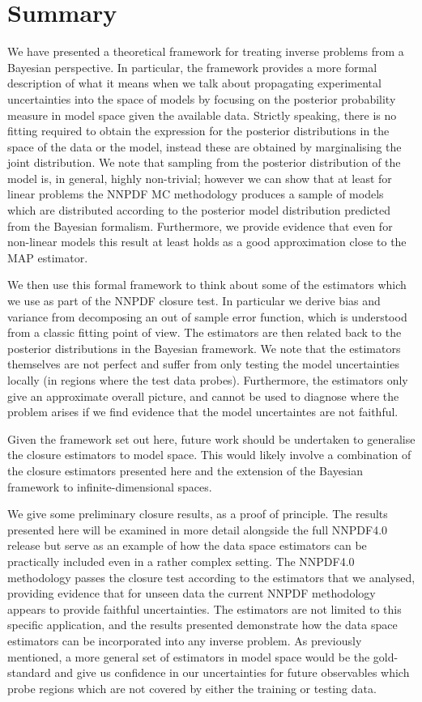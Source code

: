 \section{Summary}

We have presented a theoretical framework for treating inverse problems from a
Bayesian perspective. In particular, the framework provides a more formal
description of what it means when we talk about propagating experimental
uncertainties into the space of models by focusing on the posterior probability
measure in model space given the available data. Strictly speaking, there is no
fitting required to obtain the expression for the posterior distributions in the
space of the data or the model, instead these are obtained by marginalising the
joint distribution. We note that sampling from the posterior distribution of the
model is, in general, highly non-trivial; however we can show that at least for
linear problems the NNPDF MC methodology produces a sample of models which are
distributed according to the posterior model distribution predicted from the
Bayesian formalism. Furthermore, we provide evidence that even for non-linear
models this result at least holds as a good approximation close to the MAP
estimator.

We then use this formal framework to think about some of the estimators which we
use as part of the NNPDF closure test. In particular we derive bias and variance
from decomposing an out of sample error function, which is understood from a
classic fitting point of view. The estimators are then related back to the
posterior distributions in the Bayesian framework. We note that the estimators
themselves are not perfect and suffer from only testing the model uncertainties
locally (in regions where the test data probes). Furthermore, the estimators
only give an approximate overall picture, and cannot be used to diagnose where
the problem arises if we find evidence that the model uncertaintes are not
faithful.

Given the framework set out here, future work should be undertaken to generalise
the closure estimators to model space. This would likely involve a combination
of the closure estimators presented here and the extension of the Bayesian
framework to infinite-dimensional spaces.

We give some preliminary closure results, as a proof of principle. The results
presented here will be examined in more detail alongside the full NNPDF4.0
release but serve as an example of how the data space estimators can be
practically included even in a rather complex setting. The NNPDF4.0 methodology
passes the closure test according to the estimators that we analysed, providing
evidence that for unseen data the current NNPDF methodology appears to provide
faithful uncertainties. The estimators are not limited to this specific
application, and the results presented demonstrate how the data space estimators
can be incorporated into any inverse problem. As previously mentioned, a more
general set of estimators in model space would be the gold-standard and give us
confidence in our uncertainties for future observables which probe regions which
are not covered by either the training or testing data.

